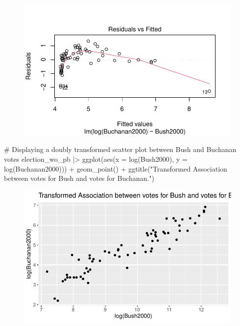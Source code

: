 \documentclass[
  letterpaper,
  DIV=11,
  numbers=noendperiod]{scrartcl}
\newenvironment{Shaded}{\begin{snugshade}}{\end{snugshade}}
\newcommand{\AttributeTok}[1]{\textcolor[rgb]{0.40,0.45,0.13}{#1}}
\newcommand{\CommentTok}[1]{\textcolor[rgb]{0.37,0.37,0.37}{#1}}
\newcommand{\FunctionTok}[1]{\textcolor[rgb]{0.28,0.35,0.67}{#1}}
\newcommand{\NormalTok}[1]{\textcolor[rgb]{0.00,0.23,0.31}{#1}}
\newcommand{\SpecialCharTok}[1]{\textcolor[rgb]{0.37,0.37,0.37}{#1}}
\newcommand{\StringTok}[1]{\textcolor[rgb]{0.13,0.47,0.30}{#1}}
\begin{document}
\begin{figure}[H]

{\centering \includegraphics{case_study_1_files/figure-pdf/unnamed-chunk-4-1.pdf}

}

\end{figure}

\begin{Shaded}
\begin{Highlighting}[]
\CommentTok{\# Displaying a doubly transformed scatter plot between Bush and Buchanan votes}
\NormalTok{election\_wo\_pb }\SpecialCharTok{|\textgreater{}} \FunctionTok{ggplot}\NormalTok{(}\FunctionTok{aes}\NormalTok{(}\AttributeTok{x =} \FunctionTok{log}\NormalTok{(Bush2000), }\AttributeTok{y =} \FunctionTok{log}\NormalTok{(Buchanan2000))) }\SpecialCharTok{+} \FunctionTok{geom\_point}\NormalTok{() }\SpecialCharTok{+} \FunctionTok{ggtitle}\NormalTok{(}\StringTok{"Transformed Association between votes for Bush and votes for Buchanan."}\NormalTok{)}
\end{Highlighting}
\end{Shaded}

\begin{figure}[H]

{\centering \includegraphics{case_study_1_files/figure-pdf/unnamed-chunk-4-2.pdf}

}

\end{figure}
\end{document}
